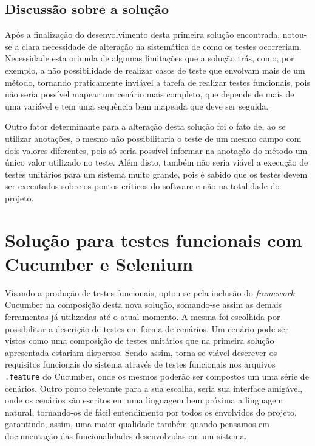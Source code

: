 \documentclass[tg]{mdtufsm}
\begin{document}
\subsection{Discussão sobre a solução}
Após a finalização do desenvolvimento desta primeira solução encontrada, notou-se a clara necessidade de alteração na sistemática de como os testes ocorreriam. Necessidade esta oriunda de algumas limitações que a solução trás,
como, por exemplo, a não possibilidade de realizar casos de teste que envolvam mais de um método, tornando praticamente inviável a tarefa de realizar testes funcionais, pois não seria possível mapear um cenário mais completo, que depende
de mais de uma variável e tem uma sequência bem mapeada que deve ser seguida.

Outro fator determinante para a alteração desta solução foi o fato de, ao se utilizar anotações, o mesmo não possibilitaria o teste de um mesmo campo com dois valores diferentes, pois só seria possível informar na anotação do
método um único valor utilizado no teste. Além disto, também não seria viável a execução de testes unitários para um sistema muito grande, pois é sabido que os testes devem ser executados sobre os pontos críticos do software e não na totalidade do projeto.

\section{Solução para testes funcionais com Cucumber e Selenium}
Visando a produção de testes funcionais, optou-se pela inclusão do \emph{framework} Cucumber na composição desta nova solução, somando-se assim as demais ferramentas já utilizadas até o atual momento. A mesma foi escolhida por possibilitar a descrição de testes em forma de cenários. Um cenário pode ser vistos como uma composição de testes unitários que na primeira solução apresentada estariam dispersos. Sendo assim, torna-se viável descrever os requisitos funcionais do sistema através de testes funcionais nos arquivos \texttt{.feature} do Cucumber, onde os mesmos poderão ser compostos um uma série de cenários. Outro ponto relevante para a sua escolha, seria sua interface amigável, onde os cenários são escritos em uma linguagem bem próxima a linguagem natural, tornando-os de fácil entendimento por todos os envolvidos do projeto, garantindo, assim, uma maior qualidade também quando pensamos em documentação das funcionalidades desenvolvidas em um sistema.
\end{document}
